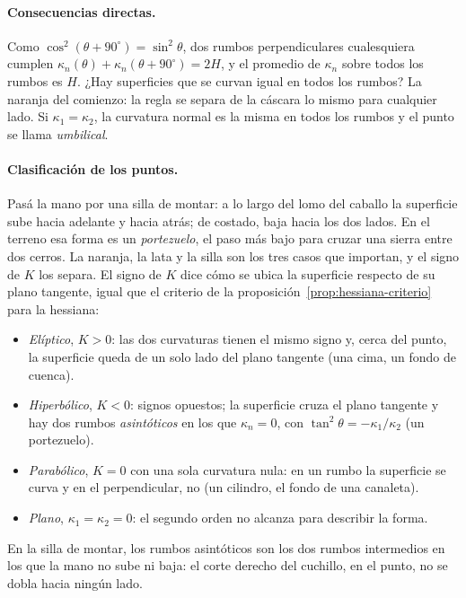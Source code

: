 \paragraph{Consecuencias directas.} Como \(\cos^2(\theta+90^\circ)=\sin^2\theta\), dos rumbos
perpendiculares cualesquiera cumplen \(\kappa_n(\theta)+\kappa_n(\theta+90^\circ)=2H\), y el
promedio de \(\kappa_n\) sobre todos los rumbos es \(H\). ¿Hay superficies que se curvan igual
en todos los rumbos? La naranja del comienzo: la regla se separa de la cáscara lo mismo para
cualquier lado. Si \(\kappa_1=\kappa_2\), la
curvatura normal es la misma en todos los rumbos y el punto se llama \emph{umbilical}.

\paragraph{Clasificación de los puntos.} Pasá la mano por una silla de montar: a lo largo del
lomo del caballo la superficie sube hacia adelante y hacia atrás; de costado, baja hacia los
dos lados. En el terreno esa forma es un \emph{portezuelo}, el paso más bajo para cruzar una
sierra entre dos cerros. La naranja, la lata y la silla son los tres casos que importan, y el
signo de \(K\) los separa. El signo de \(K\) dice cómo se ubica la superficie
respecto de su plano tangente, igual que el criterio de la
proposición~\ref{prop:hessiana-criterio} para la hessiana:
\begin{itemize}
  \item \emph{Elíptico}, \(K>0\): las dos curvaturas tienen el mismo signo y, cerca del punto, la
  superficie queda de un solo lado del plano tangente (una cima, un fondo de cuenca).
  \item \emph{Hiperbólico}, \(K<0\): signos opuestos; la superficie cruza el plano tangente y hay
  dos rumbos \emph{asintóticos} en los que \(\kappa_n=0\), con
  \(\tan^2\theta=-\kappa_1/\kappa_2\) (un portezuelo).
  \item \emph{Parabólico}, \(K=0\) con una sola curvatura nula: en un rumbo la superficie se
  curva y en el perpendicular, no (un cilindro, el fondo de una canaleta).
  \item \emph{Plano}, \(\kappa_1=\kappa_2=0\): el segundo orden no alcanza para describir la forma.
\end{itemize}
En la silla de montar, los rumbos asintóticos son los dos rumbos intermedios en los que la mano
no sube ni baja: el corte derecho del cuchillo, en el punto, no se dobla hacia ningún lado.

